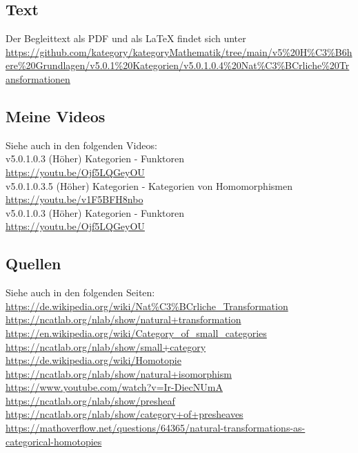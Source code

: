 \documentclass[a4paper]{amsart}
\theoremstyle{definition}
\begin{document}
\subsection*{Text}
Der Begleittext als PDF und als LaTeX findet sich unter
{\tiny
   \url{https://github.com/kategory/kategoryMathematik/tree/main/v5%20H%C3%B6here%20Grundlagen/v5.0.1%20Kategorien/v5.0.1.0.4%20Nat%C3%BCrliche%20Transformationen}
}

\subsection*{Meine Videos}
Siehe auch in den folgenden Videos:\\
v5.0.1.0.3 (Höher) Kategorien - Funktoren\\
\url{https://youtu.be/Ojf5LQGeyOU}\\
v5.0.1.0.3.5 (Höher) Kategorien - Kategorien von Homomorphismen\\
\url{https://youtu.be/v1F5BFH8nbo}\\
v5.0.1.0.3 (Höher) Kategorien - Funktoren\\
\url{https://youtu.be/Ojf5LQGeyOU}\\

\subsection*{Quellen}
Siehe auch in den folgenden Seiten:\\
\url{https://de.wikipedia.org/wiki/Nat%C3%BCrliche_Transformation}\\
\url{https://ncatlab.org/nlab/show/natural+transformation}\\
\url{https://en.wikipedia.org/wiki/Category_of_small_categories}\\
\url{https://ncatlab.org/nlab/show/small+category}\\
\url{https://de.wikipedia.org/wiki/Homotopie}\\
\url{https://ncatlab.org/nlab/show/natural+isomorphism}\\
\url{https://www.youtube.com/watch?v=Ir-DiecNUmA}\\
\url{https://ncatlab.org/nlab/show/presheaf}\\
\url{https://ncatlab.org/nlab/show/category+of+presheaves}\\
\url{https://mathoverflow.net/questions/64365/natural-transformations-as-categorical-homotopies}
\end{document}
